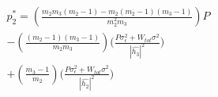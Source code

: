 \documentclass[preview]{standalone}
\begin{document}
\begin{align*}
p_2^\ast = \left(\frac{m_2 m_3( m_2 -1 ) - m_2 (m_2 -1) (m_3 - 1)}{m_2^2 m_3}\right) P \\ - \left(\frac{(m_2 - 1)(m_3 - 1)}{m_2 m_3}\right) \Bigg( \frac{P \sigma_\epsilon^2 + W_{tot} \sigma^2 }{ \left| \hat{h_3} \right| ^2 } \Bigg) \\ + \left(\frac{m_3 - 1}{m_2}\right) \Bigg( \frac{P \sigma_\epsilon^2 + W_{tot} \sigma^2}{\left|\hat{h_2}\right|^2} \Bigg)
\end{align*}
\end{document}
